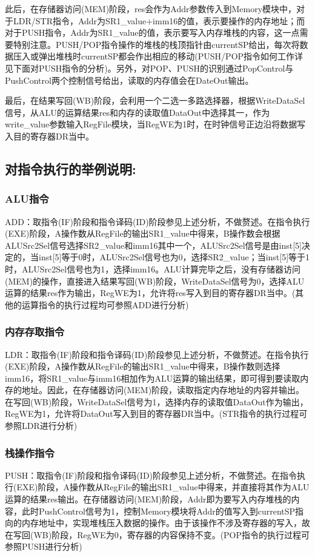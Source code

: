 \documentclass{article}
\begin{document}
此后，在存储器访问(MEM)阶段，res会作为Addr参数传入到Memory模块中，对于LDR/STR指令，Addr为SR1\_value+imm16的值，表示要操作的内存地址；而对于PUSH指令，Addr为SR1\_value的值，表示要写入内存堆栈的内容，这一点需要特别注意。PUSH/POP指令操作的堆栈的栈顶指针由currentSP给出，每次将数据压入或弹出堆栈时currentSP都会作出相应的移动(PUSH/POP指令如何工作详见下面对PUSH指令的分析)。另外，对POP、PUSH的识别通过PopControl与PushControl两个控制信号给出，读取的内存值会在DateOut输出。

最后，在结果写回(WB)阶段，会利用一个二选一多路选择器，根据WriteDataSel信号，从ALU的运算结果res和内存的读取值DataOut中选择其一，作为write\_value参数输入RegFile模块，当RegWE为1时，在时钟信号正边沿将数据写入目的寄存器DR当中。

\subsection{对指令执行的举例说明:}

\subsubsection{ALU指令}
ADD：取指令(IF)阶段和指令译码(ID)阶段参见上述分析，不做赘述。在指令执行(EXE)阶段，A操作数从RegFile的输出SR1\_value中得来，B操作数会根据ALUSrc2Sel信号选择SR2\_value和imm16其中一个，ALUSrc2Sel信号是由inst[5]决定的，当inst[5]等于0时，ALUSrc2Sel信号也为0，选择SR2\_value；当inst[5]等于1时，ALUSrc2Sel信号也为1，选择imm16。ALU计算完毕之后，没有存储器访问(MEM)的操作，直接进入结果写回(WB)阶段，WriteDataSel信号为0，选择ALU运算的结果res作为输出，RegWE为1，允许将res写入到目的寄存器DR当中。(其他的运算指令的执行过程均可参照ADD进行分析)

\subsubsection{内存存取指令}
LDR：取指令(IF)阶段和指令译码(ID)阶段参见上述分析，不做赘述。在指令执行(EXE)阶段，A操作数从RegFile的输出SR1\_value中得来，B操作数则选择imm16，将SR1\_value与imm16相加作为ALU运算的输出结果，即可得到要读取内存的地址。因此，在存储器访问(MEM)阶段，读取指定内存地址的内容并输出。在写回(WB)阶段，WriteDataSel信号为1，选择内存的读取值DataOut作为输出，RegWE为1，允许将DataOut写入到目的寄存器DR当中。(STR指令的执行过程可参照LDR进行分析)

\subsubsection{栈操作指令}
PUSH：取指令(IF)阶段和指令译码(ID)阶段参见上述分析，不做赘述。在指令执行(EXE)阶段，A操作数从RegFile的输出SR1\_value中得来，并直接将其作为ALU运算的结果res输出。在存储器访问(MEM)阶段，Addr即为要写入内存堆栈的内容，此时PushControl信号为1，控制Memory模块将Addr的值写入到currentSP指向的内存地址中，实现堆栈压入数据的操作。由于该操作不涉及寄存器的写入，故在写回(WB)阶段，RegWE为0，寄存器的内容保持不变。(POP指令的执行过程可参照PUSH进行分析)
\end{document}
